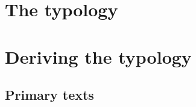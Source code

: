 \documentclass[hidelinks,a4paper,twoside,openright,11pt]{memoir}
\begin{document}
\part{The typology}\label{part:variation}



\part{Deriving the typology}\label{part:deriving}







\backmatter

\clearpage
\chapter*{Primary texts}
\begingroup
  \setlength{\LTleft}{-\tabcolsep}
\printacronyms[include=texts, heading=none]
\endgroup
{}

\newrefcontext[sorting=nyt]
\printbibliography

\end{document}
